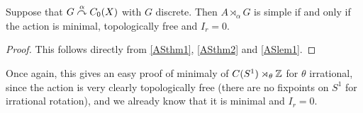 \begin{corollary}
	Suppose that $G \stackrel{\alpha}{\curvearrowright} C_0(X)$ with $G$ discrete. Then $A \rtimes_\alpha G$ is simple if and only if the action is minimal, topologically free and $I_r = 0$.
\end{corollary}
\begin{proof}
	This follows directly from \cref{ASthm1}, \cref{ASthm2} and \cref{ASlem1}.
\end{proof}
Once again, this gives an easy proof of minimaly of $C(S^1) \rtimes_{\theta} \mathbb{Z}$ for $\theta$ irrational, since the action is very clearly topologically free (there are no fixpoints on $S^1$ for irrational rotation), and we already know that it is minimal and $I_r = 0$.
